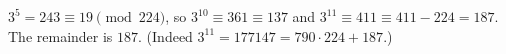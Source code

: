 $3^5=243\equiv19\pmod{224}$, so $3^{10}\equiv361\equiv137$ and $3^{11}\equiv411\equiv411-224=187$. The remainder is $\boxed{187}$. (Indeed $3^{11}=177147=790\cdot224+187$.)
